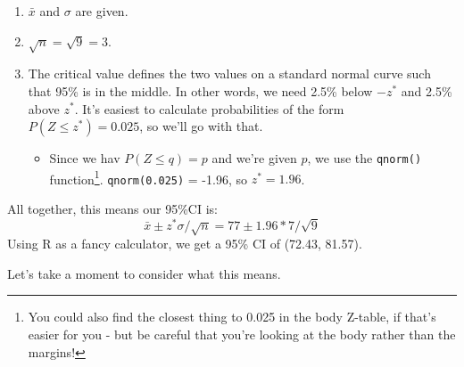 \documentclass[
  letterpaper,
  DIV=11,
  numbers=noendperiod,
  oneside]{scrreprt}
\providecommand{\tightlist}{%
  \setlength{\itemsep}{0pt}\setlength{\parskip}{0pt}}\usepackage{longtable,booktabs,array}
\begin{document}
\begin{enumerate}
\def\labelenumi{\arabic{enumi}.}
\tightlist
\item
  \(\bar x\) and \(\sigma\) are given.
\item
  \(\sqrt{n} = \sqrt{9} = 3\).
\item
  The critical value defines the two values on a standard normal curve
  such that 95\% is in the middle. In other words, we need 2.5\% below
  \(-z^*\) and 2.5\% above \(z^*\). It's easiest to calculate
  probabilities of the form \(P(Z\le z^*) = 0.025\), so we'll go with
  that.

  \begin{itemize}
  \tightlist
  \item
    Since we hav \(P(Z\le q) = p\) and we're given \(p\), we use the
    \texttt{qnorm()} function\footnote{You could also find the closest
      thing to 0.025 in the body Z-table, if that's easier for you - but
      be careful that you're looking at the body rather than the
      margins!}. \texttt{qnorm(0.025)} = -1.96, so \(z^*=1.96\).
  \end{itemize}
\end{enumerate}

All together, this means our 95\%CI is: \[
\bar x \pm z^*\sigma/\sqrt{n} = 77 \pm 1.96 * 7/\sqrt{9}
\] Using R as a fancy calculator, we get a 95\% CI of (72.43, 81.57).

Let's take a moment to consider what this means.
\end{document}
